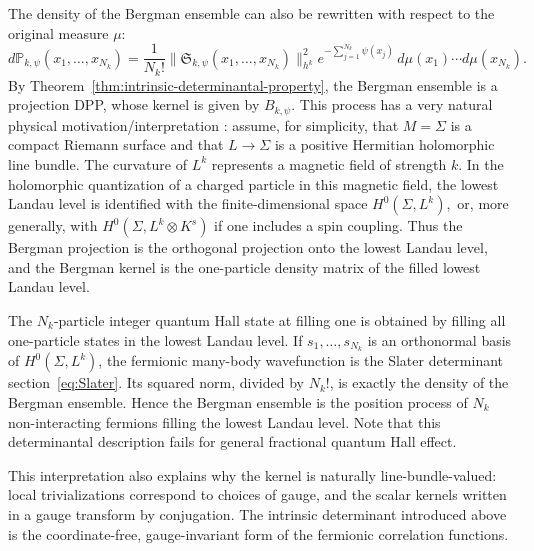 \documentclass[12pt,a4paper,reqno]{article}
\theoremstyle{thmstyleone}
\newtheorem{theorem}{Theorem}[subsection]
\theoremstyle{thmstylethree}
\theoremstyle{thmstyletwo}
\numberwithin{equation}{subsection}
\def\leq{\leqslant}
\begin{document}
The density of the Bergman ensemble can also be rewritten with respect to the original measure $\mu$:
\[
    d\mathbb P_{k,\psi}(x_1,\ldots,x_{N_k})
    =
    \frac{1}{N_k!}
    \big\|
        \mathfrak S_{k,\psi}(x_1,\ldots,x_{N_k})
    \big\|_{h^k}^{2}
    e^{-\sum_{j=1}^{N_k}\psi(x_j)}
    \,d\mu(x_1)\cdots d\mu(x_{N_k}).
\]
By  Theorem~\ref{thm:intrinsic-determinantal-property}, the Bergman ensemble is a projection DPP, whose kernel is given by $B_{k,\psi}$. This process has a very natural physical motivation/interpretation \cite{DK,Kle,Kle2}: assume, for simplicity, that $M=\Sigma$ is a compact Riemann surface and that $L\to \Sigma$ is a positive Hermitian holomorphic line bundle. The curvature of $L^k$ represents a magnetic field of strength $k$. In the holomorphic quantization of a charged particle in this magnetic field, the lowest Landau level is identified with the finite-dimensional space $H^0(\Sigma,L^k),$ or, more generally, with $H^0(\Sigma,L^k\otimes K^s)$ if one includes a spin
coupling. Thus the Bergman projection is the orthogonal projection onto the lowest Landau level, and the Bergman kernel is the one-particle density matrix of the filled lowest Landau level.

The $N_k$-particle integer quantum Hall state at filling one is obtained by filling all one-particle states in the lowest Landau level. If $s_1,\ldots,s_{N_k}$ is an orthonormal basis of $H^0(\Sigma,L^k)$, the fermionic many-body wavefunction is the Slater determinant section~\eqref{eq:Slater}. Its squared norm, divided by $N_k!$, is exactly the density of the Bergman ensemble. Hence the Bergman ensemble is the position process of $N_k$ non-interacting fermions filling the lowest Landau level. Note that this determinantal description fails for general fractional quantum Hall effect.

This interpretation also explains why the kernel is naturally line-bundle-valued: local trivializations correspond to choices of gauge, and the scalar kernels written in a gauge transform by conjugation. The intrinsic determinant introduced above is the coordinate-free, gauge-invariant form of the fermionic correlation functions.

\end{document}
